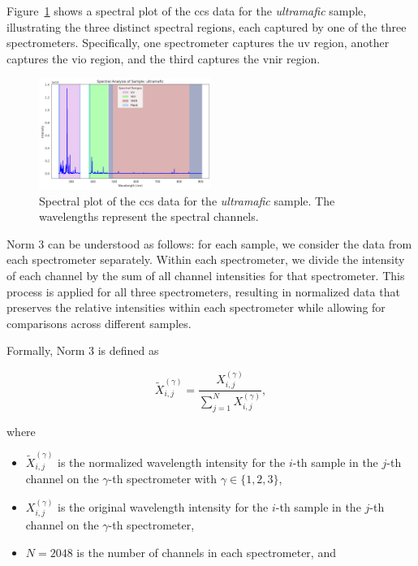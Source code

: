 Figure~\ref{fig:spectral_plot} shows a spectral plot of the \gls{ccs} data for the \textit{ultramafic} sample, illustrating the three distinct spectral regions, each captured by one of the three spectrometers. Specifically, one spectrometer captures the \gls{uv} region, another captures the \gls{vio} region, and the third captures the \gls{vnir} region.

\begin{figure}[H]
	\centering
	\includegraphics[width=0.5\textwidth]{images/spectral_plot.png}
	\caption{Spectral plot of the \gls{ccs} data for the \textit{ultramafic} sample. The wavelengths represent the spectral channels.}
	\label{fig:spectral_plot}
\end{figure}

Norm 3 can be understood as follows: for each sample, we consider the data from each spectrometer separately. Within each spectrometer, we divide the intensity of each channel by the sum of all channel intensities for that spectrometer. This process is applied for all three spectrometers, resulting in normalized data that preserves the relative intensities within each spectrometer while allowing for comparisons across different samples.

Formally, Norm 3 is defined as

\begin{equation}
	\tilde{X}_{i,j}^{(\gamma)} = \frac{X_{i,j}^{(\gamma)}}{\sum_{j=1}^{N} X_{i,j}^{(\gamma)}},
\end{equation}

where

\begin{itemize}
	\item $\tilde{X}_{i,j}^{(\gamma)}$ is the normalized wavelength intensity for the $i$-th sample in the $j$-th channel on the $\gamma$-th spectrometer with $\gamma \in \{1, 2, 3\}$,
	\item $X_{i,j}^{(\gamma)}$ is the original wavelength intensity for the $i$-th sample in the $j$-th channel on the $\gamma$-th spectrometer,
	\item $N = 2048$ is the number of channels in each spectrometer, and
\end{itemize}

